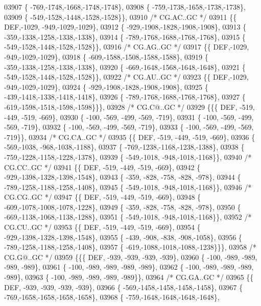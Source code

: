 \begin{DoxyCode}
03907 \{ -769,-1748,-1668,-1748,-1748\},
03908 \{ -759,-1738,-1658,-1738,-1738\},
03909 \{ -549,-1528,-1448,-1528,-1528\}\},
03910 \textcolor{comment}{/* CG.AC..GC */}
03911 \{\{  DEF,-1029, -949,-1029,-1029\},
03912 \{ -929,-1908,-1828,-1908,-1908\},
03913 \{ -359,-1338,-1258,-1338,-1338\},
03914 \{ -789,-1768,-1688,-1768,-1768\},
03915 \{ -549,-1528,-1448,-1528,-1528\}\},
03916 \textcolor{comment}{/* CG.AG..GC */}
03917 \{\{  DEF,-1029, -949,-1029,-1029\},
03918 \{ -609,-1588,-1508,-1588,-1588\},
03919 \{ -359,-1338,-1258,-1338,-1338\},
03920 \{ -669,-1648,-1568,-1648,-1648\},
03921 \{ -549,-1528,-1448,-1528,-1528\}\},
03922 \textcolor{comment}{/* CG.AU..GC */}
03923 \{\{  DEF,-1029, -949,-1029,-1029\},
03924 \{ -929,-1908,-1828,-1908,-1908\},
03925 \{ -439,-1418,-1338,-1418,-1418\},
03926 \{ -789,-1768,-1688,-1768,-1768\},
03927 \{ -619,-1598,-1518,-1598,-1598\}\}\},
03928 \textcolor{comment}{/* CG.C@..GC */}
03929 \{\{\{  DEF, -519, -449, -519, -669\},
03930 \{ -100, -569, -499, -569, -719\},
03931 \{ -100, -569, -499, -569, -719\},
03932 \{ -100, -569, -499, -569, -719\},
03933 \{ -100, -569, -499, -569, -719\}\},
03934 \textcolor{comment}{/* CG.CA..GC */}
03935 \{\{  DEF, -519, -449, -519, -669\},
03936 \{ -569,-1038, -968,-1038,-1188\},
03937 \{ -769,-1238,-1168,-1238,-1388\},
03938 \{ -759,-1228,-1158,-1228,-1378\},
03939 \{ -549,-1018, -948,-1018,-1168\}\},
03940 \textcolor{comment}{/* CG.CC..GC */}
03941 \{\{  DEF, -519, -449, -519, -669\},
03942 \{ -929,-1398,-1328,-1398,-1548\},
03943 \{ -359, -828, -758, -828, -978\},
03944 \{ -789,-1258,-1188,-1258,-1408\},
03945 \{ -549,-1018, -948,-1018,-1168\}\},
03946 \textcolor{comment}{/* CG.CG..GC */}
03947 \{\{  DEF, -519, -449, -519, -669\},
03948 \{ -609,-1078,-1008,-1078,-1228\},
03949 \{ -359, -828, -758, -828, -978\},
03950 \{ -669,-1138,-1068,-1138,-1288\},
03951 \{ -549,-1018, -948,-1018,-1168\}\},
03952 \textcolor{comment}{/* CG.CU..GC */}
03953 \{\{  DEF, -519, -449, -519, -669\},
03954 \{ -929,-1398,-1328,-1398,-1548\},
03955 \{ -439, -908, -838, -908,-1058\},
03956 \{ -789,-1258,-1188,-1258,-1408\},
03957 \{ -619,-1088,-1018,-1088,-1238\}\}\},
03958 \textcolor{comment}{/* CG.G@..GC */}
03959 \{\{\{  DEF, -939, -939, -939, -939\},
03960 \{ -100, -989, -989, -989, -989\},
03961 \{ -100, -989, -989, -989, -989\},
03962 \{ -100, -989, -989, -989, -989\},
03963 \{ -100, -989, -989, -989, -989\}\},
03964 \textcolor{comment}{/* CG.GA..GC */}
03965 \{\{  DEF, -939, -939, -939, -939\},
03966 \{ -569,-1458,-1458,-1458,-1458\},
03967 \{ -769,-1658,-1658,-1658,-1658\},
03968 \{ -759,-1648,-1648,-1648,-1648\},

\end{DoxyCode}
